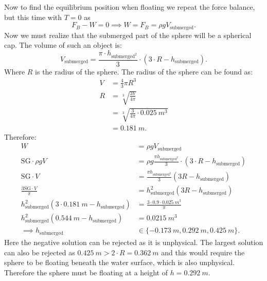 Now to find the equilibrium position when floating we repeat the force balance, but this time with $T = 0$ as
\[ 
F_B - W = 0 \implies W = F_B = \rho g V_{\mathrm{submerged}}
.\]
Now we must realize that the submerged part of the sphere will be a spherical cap. The volume of such an object is:
\[ 
V_{\mathrm{submerged}} = \frac{\pi \cdot h_{\mathrm{submerged}^2}}{3} \cdot \left( 3 \cdot R - h_{\mathrm{submerged}} \right)
.\]
Where $R$ is the radius of the sphere. The radius of the sphere can be found as:
\begin{align*}
  V &= \frac{4}{3} \pi R^3 \\
  R &= \sqrt[3]{ \frac{3V}{4\pi}} \\
    &= \sqrt[3]{\frac{3}{4\pi}\cdot \qty{0,025}{m^3} } \\
    &= \qty{0,181}{m}
.\end{align*}
Therefore:
\begin{align*}
  W &= \rho g V_{\mathrm{submerged}}\\
  \mathrm{SG} \cdot \rho g V &= \rho g \frac{\pi h_{\mathrm{submerged}^2}}{3} \cdot \left( 3 \cdot R - h_{\mathrm{submerged}} \right) \\
  \mathrm{SG} \cdot V &= \frac{\pi h_{\mathrm{submerged}^2}}{3} \left( 3 R - h_{\mathrm{submerged}}  \right) \\
  \frac{3 \mathrm{SG} \cdot V}{\pi} &= h_{\mathrm{submerged}}^2 \left( 3R - h_{\mathrm{submerged}} \right) \\
  h_{\mathrm{submerged}}^2 \left( 3 \cdot \qty{0,181}{m} - h_{\mathrm{submerged}}\right) &= \frac{3 \cdot \num{0,9} \cdot \qty{0,025}{m^3} }{\pi} \\
  h_{\mathrm{submerged}}^2 \left( \qty{0,544}{m} - h_{\mathrm{submerged}}  \right) &= \qty{0,0215}{m^3}  \\
  \implies h_{\mathrm{submerged}} &\in \{- \qty{0,173}{m}, \qty{0,292}{m}, \qty{0,425}{m} \}
.\end{align*}
Here the negative solution can be rejected as it is unphysical. The largest solution can also be rejected as $\qty{0,425}{m} > 2 \cdot R = \qty{0,362}{m}$ and this would require the sphere to be floating beneath the water surface, which is also unphysical. Therefore the sphere must be floating at a height of $h = \qty{0,292}{m}$. 
